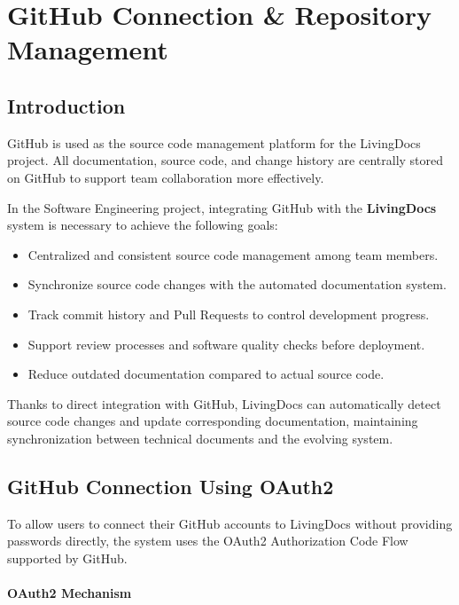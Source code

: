 \section{GitHub Connection \& Repository Management}

\subsection{Introduction}

GitHub is used as the source code management platform for the LivingDocs project. All documentation, source code, and change history are centrally stored on GitHub to support team collaboration more effectively.

In the Software Engineering project, integrating GitHub with the \textbf{LivingDocs} system is necessary to achieve the following goals:

\begin{itemize}
    \item Centralized and consistent source code management among team members.
    \item Synchronize source code changes with the automated documentation system.
    \item Track commit history and Pull Requests to control development progress.
    \item Support review processes and software quality checks before deployment.
    \item Reduce outdated documentation compared to actual source code.
\end{itemize}

Thanks to direct integration with GitHub, LivingDocs can automatically detect source code changes and update corresponding documentation, maintaining synchronization between technical documents and the evolving system.

\subsection{GitHub Connection Using OAuth2}

To allow users to connect their GitHub accounts to LivingDocs without providing passwords directly, the system uses the OAuth2 Authorization Code Flow supported by GitHub.

\paragraph{OAuth2 Mechanism}

